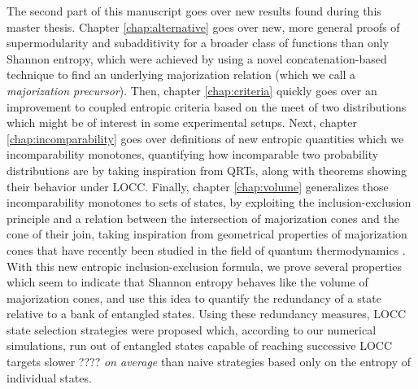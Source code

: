 The second part of this manuscript goes over new results found during this master thesis. Chapter \ref{chap:alternative} goes over new, more general proofs of supermodularity and subadditivity for a broader class of functions than only Shannon entropy, which were achieved by using a novel concatenation-based technique to find an underlying majorization relation (which we call a \textit{majorization precursor}). Then, chapter \ref{chap:criteria} quickly goes over an improvement to coupled entropic criteria based on the meet of two distributions which might be of interest in some experimental setups. Next, chapter \ref{chap:incomparability} goes over definitions of new entropic quantities which we incomparability monotones, quantifying how incomparable two probability distributions are by taking inspiration from QRTs, along with theorems showing their behavior under LOCC. Finally, chapter \ref{chap:volume} generalizes those incomparability monotones to sets of states, by exploiting the inclusion-exclusion principle and a relation between the intersection of majorization cones and the cone of their join, taking inspiration from geometrical properties of majorization cones that have recently been studied in the field of quantum thermodynamics \cite{junior_geometric_2022}. With this new entropic inclusion-exclusion formula, we prove several properties which seem to indicate that Shannon entropy behaves like the volume of majorization cones, and use this idea to quantify the redundancy of a state relative to a bank of entangled states. Using these redundancy measures, LOCC state selection strategies were proposed which, according to our numerical simulations, run out of entangled states capable of reaching successive LOCC targets slower ???? \textit{on average} than naive strategies based only on the entropy of individual states.